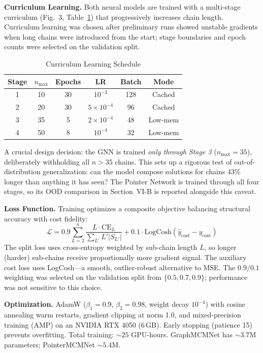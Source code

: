 \documentclass[conference]{IEEEtran}
\begin{document}
\textbf{Curriculum Learning.} Both neural models are trained with a
multi-stage curriculum (Fig.~3, Table~\ref{tab:curriculum}) that progressively
increases chain length. Curriculum learning was chosen after preliminary runs
showed unstable gradients when long chains were introduced from the start;
stage boundaries and epoch counts were selected on the validation split.

\begin{table}[t]
\caption{Curriculum Learning Schedule}
\label{tab:curriculum}
\centering
\begin{tabular}{cccccc}
\toprule
Stage & $n_{\max}$ & Epochs & LR & Batch & Mode \\
\midrule
1 & 10 & 30 & $10^{-3}$ & 128 & Cached \\
2 & 20 & 30 & $5 \times 10^{-4}$ & 96 & Cached \\
3 & 35 & 5 & $2 \times 10^{-4}$ & 48 & Low-mem \\
4 & 50 & 8 & $10^{-4}$ & 32 & Low-mem \\
\bottomrule
\end{tabular}
\end{table}

A crucial design decision: the GNN is trained \emph{only through Stage 3}
($n_{\max}{=}35$), deliberately withholding all $n{>}35$ chains. This sets up a
rigorous test of out-of-distribution generalization: can the model compose
solutions for chains 43\% longer than anything it has seen? The Pointer
Network is trained through all four stages, so its OOD comparison in
Section~VI-B is reported alongside this caveat.

\textbf{Loss Function.} Training optimizes a composite objective balancing
structural accuracy with cost fidelity:
\begin{equation}
\mathcal{L} = 0.9 \sum_{L=2}^{n} \frac{L \cdot \mathrm{CE}_L}{\sum_{L'} L' |S_{L'}|}
+ 0.1 \cdot \mathrm{LogCosh}(\hat{y}_{\mathrm{cost}} - y_{\mathrm{cost}})
\end{equation}
The split loss uses cross-entropy weighted by sub-chain length $L$, so longer
(harder) sub-chains receive proportionally more gradient signal. The auxiliary
cost loss uses LogCosh---a smooth, outlier-robust alternative to MSE. The
$0.9/0.1$ weighting was selected on the validation split from
$\{0.5, 0.7, 0.9\}$; performance was not sensitive to this choice.

\textbf{Optimization.} AdamW ($\beta_1{=}0.9$, $\beta_2{=}0.98$, weight decay
$10^{-4}$) with cosine annealing warm restarts, gradient clipping at norm 1.0,
and mixed-precision training (AMP) on an NVIDIA RTX 4050 (6\,GB). Early
stopping (patience 15) prevents overfitting. Total training: ${\sim}25$
GPU-hours. GraphMCMNet has ${\sim}3.7$M parameters; PointerMCMNet ${\sim}5.4$M.
\end{document}
